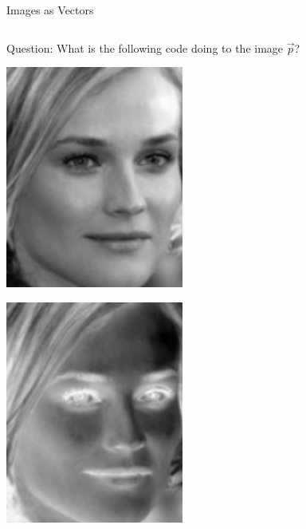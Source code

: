 \documentclass[10pt,aspectratio=169,usenames,dvipsnames]{beamer} %
\begin{document}
\begin{frame}[fragile]{Images as Vectors}
\begin{center}
\begin{columns}[T,onlytextwidth]
\begin{block}{Question: What is the following code doing to the image $\vec{p}$?}
\begin{minipage}{0.45\textwidth}
			
		\end{minipage}\hfill
		\pause
		\begin{minipage}{0.2\textwidth}
			\centering\includegraphics[width=0.6\textwidth]{images/vectormatrix/Diane_Kruger}
		\end{minipage}
		\begin{minipage}{0.2\textwidth}
			\centering\includegraphics[width=0.6\textwidth]{images/vectormatrix/Diane_Kruger_negative}
		\end{minipage}
	\end{block}
\end{columns}
\end{center}
\end{frame}
\end{document}

